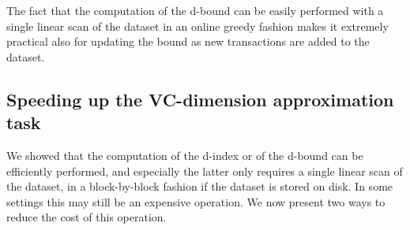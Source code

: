 The fact that the computation of the d-bound can be easily performed with a
single linear scan of the dataset in an online greedy fashion makes it extremely
practical also for updating the bound as new transactions are added to the dataset.

%

\subsection{Speeding up the VC-dimension approximation task}\label{sec:vcminevcapprox}
We showed that the computation of the d-index or of the d-bound can be
efficiently performed, and especially the latter only requires a single linear
scan of the dataset, in a block-by-block fashion if the dataset is
stored on disk. In some settings this may still be an expensive operation. We
now present two ways to reduce the cost of this operation.

